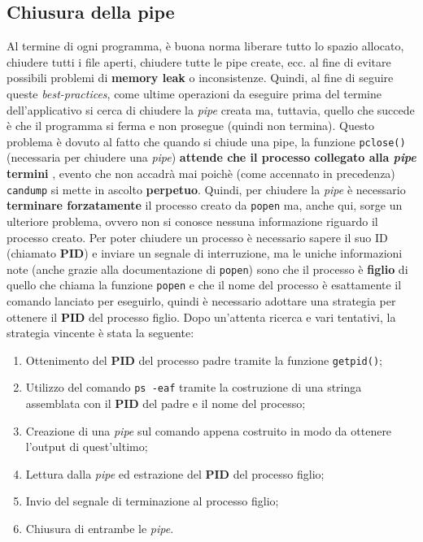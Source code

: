 \subsection{Chiusura della pipe}
Al termine di ogni programma, è buona norma liberare tutto lo spazio allocato, chiudere tutti i file aperti, chiudere tutte le pipe create, ecc. al fine di evitare possibili problemi di \textbf{memory leak} o inconsistenze. Quindi, al fine di seguire queste \emph{best-practices}, come ultime operazioni da eseguire prima del termine dell'applicativo si cerca di chiudere la \emph{pipe} creata ma, tuttavia, quello che succede è che il programma si ferma e non prosegue (quindi non termina). Questo problema è dovuto al fatto che quando si chiude una pipe, la funzione \texttt{pclose()} (necessaria per chiudere una \emph{pipe}) \textbf{attende che il processo collegato alla \emph{pipe} termini} \cite{linux_man_page_pipe}, evento che non accadrà mai poichè (come accennato in precedenza) \texttt{candump} si mette in ascolto \textbf{perpetuo}. Quindi, per chiudere la \emph{pipe} è necessario \textbf{terminare forzatamente} il processo creato da \texttt{popen} ma, anche qui, sorge un ulteriore problema, ovvero non si conosce nessuna informazione riguardo il processo creato. Per poter chiudere un processo è necessario sapere il suo ID (chiamato \textbf{PID}) e inviare un segnale di interruzione, ma le uniche informazioni note (anche grazie alla documentazione di \texttt{popen}) sono che il processo è \textbf{figlio} di quello che chiama la funzione \texttt{popen} e che il nome del processo è esattamente il comando lanciato per eseguirlo, quindi è necessario adottare una strategia per ottenere il \textbf{PID} del processo figlio. Dopo un'attenta ricerca e vari tentativi, la strategia vincente è stata la seguente:
\begin{enumerate}
    \item Ottenimento del \textbf{PID} del processo padre tramite la funzione \texttt{getpid()};
    \item Utilizzo del comando \texttt{ps -eaf} tramite la costruzione di una stringa assemblata con il \textbf{PID} del padre e il nome del processo;
    \item Creazione di una \emph{pipe} sul comando appena costruito in modo da ottenere l'output di quest'ultimo;
    \item Lettura dalla \emph{pipe} ed estrazione del \textbf{PID} del processo figlio;
    \item Invio del segnale di terminazione al processo figlio;
    \item Chiusura di entrambe le \emph{pipe}.
\end{enumerate}

